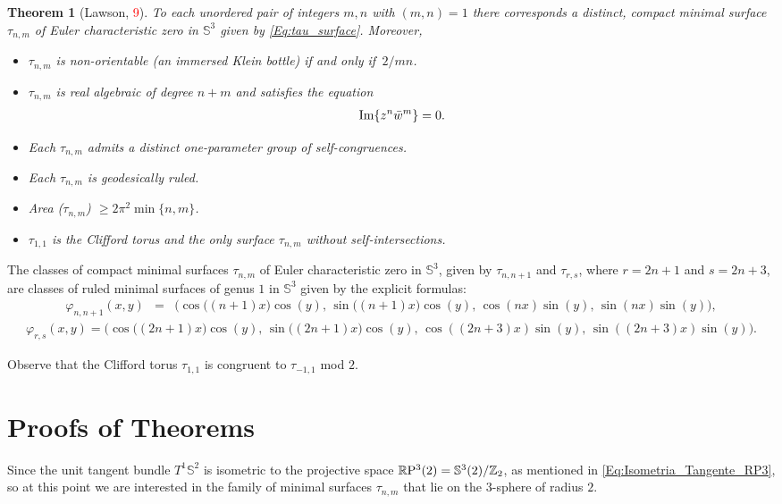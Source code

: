\documentclass[reqno,11pt]{amsart}
\newtheorem{theorem}{Theorem}
\begin{document}
\begin{theorem}[Lawson, \textcolor{red}{9}] \label{Thm:Propriedades_Lawsons}
To each unordered pair of integers $m, n$ with
$(m, n) = 1$ there corresponds a distinct, compact minimal surface $\tau_{n,m}$ of Euler characteristic zero in $\mathbb{S}^3$ given by \eqref{Eq:tau_surface}. Moreover,
\begin{itemize}
    \item [(a)] $\tau_{n,m}$ is non-orientable (an immersed Klein bottle) if and only if $\,2/mn$.
    \item [(b)] $\tau_{n,m}$ is real algebraic of degree $n + m$ and satisfies the equation
    \begin{eqnarray*}
        {\rm Im} \{z^n\bar{w}^m\} = 0.
    \end{eqnarray*}
    \item [(c)] Each $\tau_{n,m}$ admits a distinct one-parameter group of self-congruences. 
    \item [(d)] Each $\tau_{n,m}$ is geodesically ruled.
    \item [(e)] Area ($\tau_{n,m}$) $\geq 2\pi^2 \min\{n,m\}$. 
    \item [(f)]  $\tau_{1,1}$ is the Clifford torus and the only surface $\tau_{n,m}$ without self-intersections.
\end{itemize}
\end{theorem}

\noindent The classes of compact minimal surfaces $\tau_{n,m}$ of Euler characteristic zero in $\mathbb{S}^3$, given by $\tau_{n,n+1}$ and $\tau_{r,s}$, where $r=2n+1$ and $s=2n+3$, are classes of ruled minimal surfaces of genus $1$ in $\mathbb{S}^3$ given by the explicit formulas:
\begin{eqnarray*}
    \varphi_{n,n+1}(x, y)&=& 
    \bigg(\cos\big((n+1)x\big)\cos(y),\,
    \sin\big((n+1)x\big) \cos(y),\, 
    \cos(nx) \sin(y),\, 
    \sin(nx) \sin(y)\bigg),       
\end{eqnarray*}
\begin{eqnarray*}
    \varphi_{r,s}(x, y) = 
    \bigg(\cos\big((2n+1)x\big)\cos(y),\,
    \sin\big((2n+1)x\big) \cos(y),\, 
    \cos((2n+3)x) \sin(y),\, 
    \sin((2n+3)x) \sin(y)\bigg).        
\end{eqnarray*}

\noindent Observe that the Clifford torus $\tau_{1,1}$ is congruent to $\tau_{-1,1}$ mod $2$.


\section{Proofs of Theorems}
Since the unit tangent bundle $T^1\mathbb{S}^2$ is isometric to the projective space $\mathbb{R}\rm{P}^3(2)= \mathbb{S}^3(2)/\mathbb{Z}_2$, as mentioned in \eqref{Eq:Isometria_Tangente_RP3}, so at this point we are interested in the family of minimal surfaces $\tau_{n,m}$ that lie on the $3$-sphere of radius $2$. 
\end{document}
